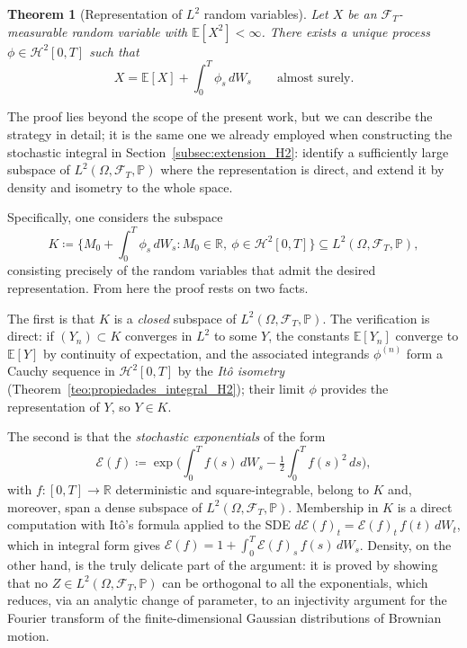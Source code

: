 \documentclass[11pt,a4paper,oneside]{report}
\theoremstyle{plain}
\newtheorem{teorema}{Theorem}[chapter]
\theoremstyle{definition}
\theoremstyle{remark}
\newcommand{\R}{\mathbb{R}}
\newcommand{\E}{\mathbb{E}}
\newcommand{\PP}{\mathbb{P}}
\newcommand{\F}{\mathcal{F}}
\newcommand{\1}{\mathbf{1}}
\newcommand{\eqdef}{\coloneqq}
\begin{document}
\begin{teorema}[Representation of $L^2$ random variables]
\label{teo:representacion_l2}
Let $X$ be an $\F_T$-measurable random variable with
$\E[X^2] < \infty$. There exists a unique process
$\phi \in \mathcal{H}^2[0, T]$ such that
\begin{equation}\label{eq:representacion_l2}
  X = \E[X] + \int_0^T \phi_s\, dW_s
  \qquad \text{almost surely}.
\end{equation}
\end{teorema}

The proof lies beyond the scope of the present work, but we can
describe the strategy in detail; it is the same one we already
employed when constructing the stochastic integral in
Section~\ref{subsec:extension_H2}: identify a sufficiently large
subspace of $L^2(\Omega, \F_T, \PP)$ where the representation is
direct, and extend it by density and isometry to the whole space.

Specifically, one considers the subspace
\[
  K \eqdef \biggl\{ M_0 + \int_0^T \phi_s\, dW_s :
                    M_0 \in \R,\ \phi \in \mathcal{H}^2[0, T] \biggr\}
  \subseteq L^2(\Omega, \F_T, \PP),
\]
consisting precisely of the random variables that admit the desired
representation. From here the proof rests on two facts.

The first is that $K$ is a \emph{closed} subspace of
$L^2(\Omega, \F_T, \PP)$. The verification is direct: if
$(Y_n) \subset K$ converges in $L^2$ to some $Y$, the constants
$\E[Y_n]$ converge to $\E[Y]$ by continuity of expectation, and the
associated integrands $\phi^{(n)}$ form a Cauchy sequence in
$\mathcal{H}^2[0, T]$ by the \emph{Itô isometry}
(Theorem~\ref{teo:propiedades_integral_H2}); their limit $\phi$
provides the representation of $Y$, so $Y \in K$.

The second is that the \emph{stochastic exponentials} of the form
\begin{equation*}
  \mathcal{E}(f)
  \eqdef \exp\!\biggl(\int_0^T f(s)\, dW_s
                       - \tfrac{1}{2} \int_0^T f(s)^2\, ds\biggr),
\end{equation*}
with $f : [0, T] \to \R$ deterministic and square-integrable, belong
to $K$ and, moreover, span a dense subspace of
$L^2(\Omega, \F_T, \PP)$. Membership in $K$ is a direct computation
with Itô's formula applied to the SDE
$d\mathcal{E}(f)_t = \mathcal{E}(f)_t\, f(t)\, dW_t$, which in
integral form gives
$\mathcal{E}(f) = 1 + \int_0^T \mathcal{E}(f)_s\, f(s)\, dW_s$.
Density, on the other hand, is the truly delicate part of the
argument: it is proved by showing that no $Z \in L^2(\Omega, \F_T, \PP)$
can be orthogonal to all the exponentials, which reduces, via an
analytic change of parameter, to an injectivity argument for the
Fourier transform of the finite-dimensional Gaussian distributions of
Brownian motion.
\end{document}
